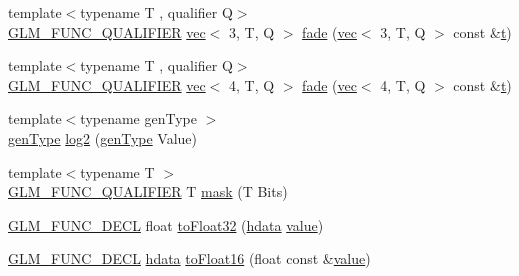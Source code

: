 \begin{DoxyCompactItemize}
\item 
{\footnotesize template$<$typename T , qualifier Q$>$ }\\\mbox{\hyperlink{setup_8hpp_a33fdea6f91c5f834105f7415e2a64407}{G\+L\+M\+\_\+\+F\+U\+N\+C\+\_\+\+Q\+U\+A\+L\+I\+F\+I\+ER}} \mbox{\hyperlink{structglm_1_1vec}{vec}}$<$ 3, T, Q $>$ \mbox{\hyperlink{namespaceglm_1_1detail_afaca75ccf77b14b266db747f83adb11a}{fade}} (\mbox{\hyperlink{structglm_1_1vec}{vec}}$<$ 3, T, Q $>$ const \&\mbox{\hyperlink{_s_d_l__opengl_8h_a7d65d00ca3b0630d9b5c52df855b19f5}{t}})
\item 
{\footnotesize template$<$typename T , qualifier Q$>$ }\\\mbox{\hyperlink{setup_8hpp_a33fdea6f91c5f834105f7415e2a64407}{G\+L\+M\+\_\+\+F\+U\+N\+C\+\_\+\+Q\+U\+A\+L\+I\+F\+I\+ER}} \mbox{\hyperlink{structglm_1_1vec}{vec}}$<$ 4, T, Q $>$ \mbox{\hyperlink{namespaceglm_1_1detail_afcf366be6c9ccc0ab6166b7d4b2edea2}{fade}} (\mbox{\hyperlink{structglm_1_1vec}{vec}}$<$ 4, T, Q $>$ const \&\mbox{\hyperlink{_s_d_l__opengl_8h_a7d65d00ca3b0630d9b5c52df855b19f5}{t}})
\item 
{\footnotesize template$<$typename gen\+Type $>$ }\\\mbox{\hyperlink{structglm_1_1detail_1_1gen_type}{gen\+Type}} \mbox{\hyperlink{namespaceglm_1_1detail_a3d24a612f2c5fa4f3aaf97dcd979ef1c}{log2}} (\mbox{\hyperlink{structglm_1_1detail_1_1gen_type}{gen\+Type}} Value)
\item 
{\footnotesize template$<$typename T $>$ }\\\mbox{\hyperlink{setup_8hpp_a33fdea6f91c5f834105f7415e2a64407}{G\+L\+M\+\_\+\+F\+U\+N\+C\+\_\+\+Q\+U\+A\+L\+I\+F\+I\+ER}} T \mbox{\hyperlink{namespaceglm_1_1detail_a048ad00e8777f9f3ebe185ed48857df0}{mask}} (T Bits)
\item 
\mbox{\hyperlink{setup_8hpp_ab2d052de21a70539923e9bcbf6e83a51}{G\+L\+M\+\_\+\+F\+U\+N\+C\+\_\+\+D\+E\+CL}} float \mbox{\hyperlink{namespaceglm_1_1detail_a8e4719d94d99ee1e625496e04317272b}{to\+Float32}} (\mbox{\hyperlink{namespaceglm_1_1detail_aa2115f7dd38e14fea7ba9e95104120f3}{hdata}} \mbox{\hyperlink{_s_d_l__opengl__glext_8h_a8ad81492d410ff2ac11f754f4042150f}{value}})
\item 
\mbox{\hyperlink{setup_8hpp_ab2d052de21a70539923e9bcbf6e83a51}{G\+L\+M\+\_\+\+F\+U\+N\+C\+\_\+\+D\+E\+CL}} \mbox{\hyperlink{namespaceglm_1_1detail_aa2115f7dd38e14fea7ba9e95104120f3}{hdata}} \mbox{\hyperlink{namespaceglm_1_1detail_ac16321696a34b41c55f941b319d50652}{to\+Float16}} (float const \&\mbox{\hyperlink{_s_d_l__opengl__glext_8h_a8ad81492d410ff2ac11f754f4042150f}{value}})

\end{DoxyCompactItemize}

